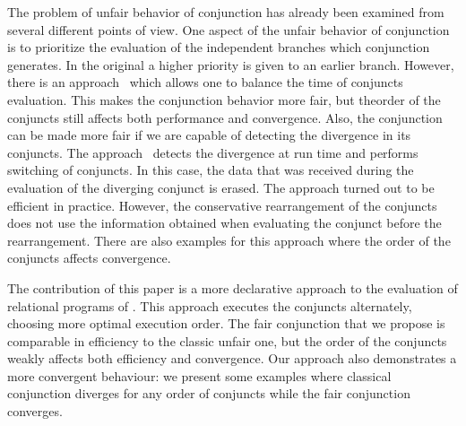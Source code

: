 The problem of unfair behavior of conjunction has already been examined from several different points of view. One aspect of the unfair behavior of conjunction is to prioritize the
evaluation of the independent branches which conjunction generates. In the original \mk a higher priority is given to an earlier branch. However, there is an approach~\cite{fair:towardsAM}
which allows one to balance the time of conjuncts evaluation. This makes the conjunction behavior more fair, but theorder of the conjuncts still affects both performance and convergence.
Also, the conjunction can be made more fair if we are capable of detecting the divergence in its conjuncts. The approach~\cite{fair:DivTest} detects the divergence at run time and
performs switching of conjuncts. In this case, the data that was received during the evaluation of the diverging conjunct is erased. The approach turned out to be efficient in practice.
However, the conservative rearrangement of the conjuncts does not use the information obtained when evaluating the conjunct before the rearrangement. There are also examples for
this approach where the order of the conjuncts affects convergence.

The contribution of this paper is a more declarative approach to the evaluation of relational programs of \mk. This approach executes the conjuncts alternately, choosing more optimal execution order.
The fair conjunction that we propose is comparable in efficiency to the classic unfair one, but the order of the conjuncts weakly affects both efficiency and convergence. Our approach also 
demonstrates a more convergent behaviour: we present some examples where classical conjunction diverges for any order of conjuncts while the fair conjunction converges.


